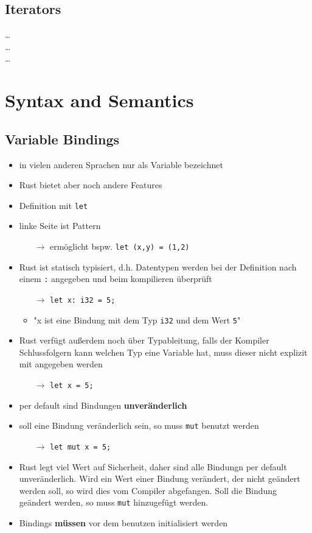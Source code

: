 \documentclass[a4paper,12pt]{article}
\begin{document}
\subsection{Iterators}
\dots\\
\dots\\
\dots
\newpage	

\section{Syntax and Semantics}
\subsection{Variable Bindings}
	\begin{itemize}
	  \item in vielen anderen Sprachen nur als Variable bezeichnet
	  \item Rust bietet aber noch andere Features
	  \item Definition mit \verb|let|
	  \item linke Seite ist Pattern
	  \begin{itemize}
	  	\item[$\rightarrow$] ermöglicht bspw. \verb|let (x,y) = (1,2)| 
	  \end{itemize}
	  \item Rust ist statisch typisiert, d.h. Datentypen werden bei der Definition nach einem \verb|:| angegeben und beim kompilieren überprüft
	  \begin{itemize}
	  	\item[$\rightarrow$] \verb|let x: i32 = 5;| 
	  	\item "x ist eine Bindung mit dem Typ \verb|i32| und dem Wert \verb|5|"
	  \end{itemize}
	  \item Rust verfügt außerdem noch über Typableitung, falls der Kompiler Schlussfolgern kann welchen Typ eine Variable hat, muss dieser nicht explizit mit angegeben werden 
	  \begin{itemize}
	      \item[$\rightarrow$] \verb|let x = 5;| 
	  \end{itemize}
	  \item per default sind Bindungen \textbf{unveränderlich}
	  \item soll eine Bindung veränderlich sein, so muss \verb|mut| benutzt werden
	  \begin{itemize}
	      \item[$\rightarrow$] \verb|let mut x = 5;| 
	  \end{itemize}
	  \item Rust legt viel Wert auf Sicherheit, daher sind alle Bindungn per default unveränderlich. Wird ein Wert einer Bindung verändert, der nicht geändert werden soll, so wird dies vom Compiler abgefangen. Soll die Bindung geändert werden, so muss \verb|mut| hinzugefügt werden.
	  \item Bindings \textbf{müssen} vor dem benutzen initialisiert werden
	\end{itemize}
\end{document}
